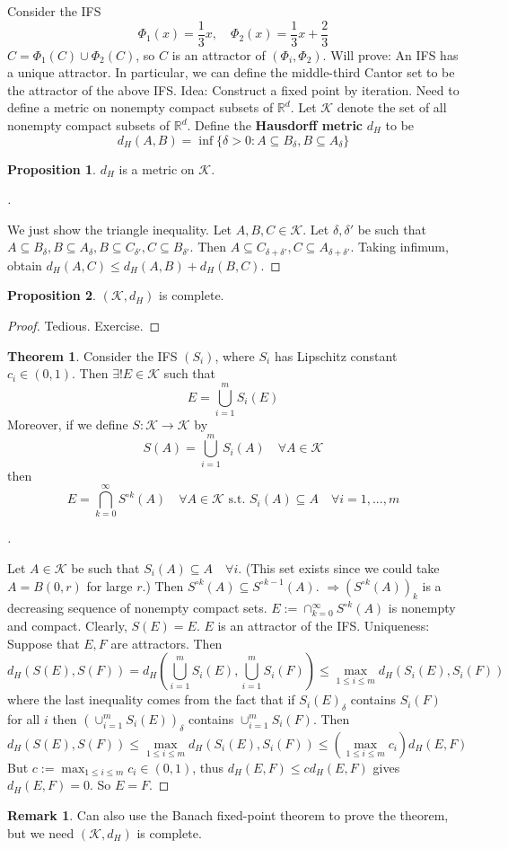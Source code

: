 \documentclass{article}
\theoremstyle{definition}
\newtheorem{thm}{Theorem}
\newtheorem{rem}{Remark}
\newtheorem{prop}{Proposition}
\newenvironment{proofs}[1][\proofname]{%
  \begin{proof}[#1]$ $\par\nobreak\ignorespaces
}{%
  \end{proof}
}
\newcommand{\K}{\mathcal K}
\newcommand{\RR}{\mathbb R}
\newcommand{\Ra}{\Rightarrow}
\begin{document}
Consider the IFS
\[
	\Phi_1(x) = \frac{1}{3} x, \quad \Phi_2(x) = \frac{1}{3} x + \frac{2}{3}
\]
$C = \Phi_1(C) \cup \Phi_2(C)$, so $C$ is an attractor of $(\Phi_i, \Phi_2)$.
Will prove: An IFS has a unique attractor.
In particular, we can define the middle-third Cantor set to be the attractor of the above IFS.
Idea: Construct a fixed point by iteration.
Need to define a metric on nonempty compact subsets of $\RR^d$.
Let $\K$ denote the set of all nonempty compact subsets of $\RR^d$.
Define the \textbf{Hausdorff metric} $d_H$ to be
\[
	d_H(A, B) = \inf\{\delta > 0: A \subseteq B_\delta, B \subseteq A_\delta\}
\]

\begin{prop}
	$d_H$ is a metric on $\K$.
\end{prop}

\begin{proofs}
	We just show the triangle inequality.
	Let $A, B, C \in \K$.
	Let $\delta, \delta'$ be such that $A \subseteq B_\delta, B \subseteq A_\delta, B \subseteq C_{\delta'}, C \subseteq B_{\delta'}$.
	Then $A \subseteq C_{\delta + \delta'}, C \subseteq A_{\delta + \delta'}$.
	Taking infimum, obtain $d_H(A, C) \leq d_H(A, B) + d_H(B, C)$.
\end{proofs}

\begin{prop}
	$(\K, d_H)$ is complete.
\end{prop}

\begin{proof}
	Tedious. Exercise.
\end{proof}

\begin{thm}
	Consider the IFS $(S_i)$, where $S_i$ has Lipschitz constant $c_i \in (0, 1)$.
	Then $\exists ! E \in \K$ such that
	\[
		E = \bigcup_{i = 1}^m S_i(E)
	\]
	Moreover, if we define $S: \K \to \K$ by 
	\[
		S(A) = \bigcup_{i = 1}^m S_i(A) \quad \forall A \in \K
	\]
	then
	\[
		E = \bigcap_{k = 0}^\infty S^{\circ k} (A) \quad \forall A \in \K \text{ s.t. } S_i(A) \subseteq A \quad \forall i = 1, ..., m
	\]
\end{thm}

\begin{proofs}
	Let $A \in \K$ be such that $S_i(A) \subseteq A \quad \forall i$.
	(This set exists since we could take $A = B(0, r)$ for large $r$.)
	Then $S^{\circ k}(A) \subseteq S^{\circ k - 1}(A)$.
	$\Ra (S^{\circ k}(A))_k$ is a decreasing sequence of nonempty compact sets.
	$E := \cap_{k = 0}^\infty S^{\circ k}(A)$ is nonempty and compact.
	Clearly, $S(E) = E$.
	$E$ is an attractor of the IFS.
	Uniqueness:
	Suppose that $E, F$ are attractors.
	Then 
	\[
		d_H(S(E), S(F)) = d_H\left(\bigcup_{i = 1}^m S_i(E), \bigcup_{i = 1}^m S_i(F)\right) \leq \max_{1 \leq i \leq m} d_H(S_i(E), S_i(F))
	\]
	where the last inequality comes from the fact that if $S_i(E)_\delta$ contains $S_i(F)$ for all $i$ then $(\cup_{i = 1}^m S_i(E))_\delta$ contains $\cup_{i = 1}^m S_i(F)$.
	Then
	\[
		d_H(S(E), S(F)) \leq \max_{1 \leq i \leq m} d_H(S_i(E), S_i(F)) \leq (\max_{1 \leq i \leq m} c_i) d_H(E, F)	
	\]
	But $c := \max_{1 \leq i \leq m} c_i \in (0, 1)$, thus $d_H(E, F) \leq c d_H(E, F)$ gives $d_H(E, F) = 0$.
	So $E = F$.
\end{proofs}

\begin{rem}
	Can also use the Banach fixed-point theorem to prove the theorem, but we need $(\K, d_H)$ is complete.
\end{rem}
\end{document}
